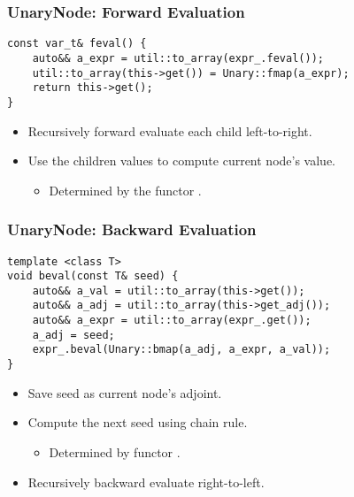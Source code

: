 \begin{frame}[fragile]
\frametitle{UnaryNode: Forward Evaluation}
\begin{lstlisting}[style=customcpp]
const var_t& feval() {
    auto&& a_expr = util::to_array(expr_.feval());
    util::to_array(this->get()) = Unary::fmap(a_expr);
    return this->get();
}
\end{lstlisting}
\begin{itemize}
\item Recursively forward evaluate each child left-to-right.
\item Use the children values to compute current node's value.
    \begin{itemize}
        \item Determined by the functor .
    \end{itemize}
\end{itemize}
\end{frame}

\begin{frame}[fragile]
\frametitle{UnaryNode: Backward Evaluation}
\begin{lstlisting}[style=customcpp]
template <class T>
void beval(const T& seed) {
    auto&& a_val = util::to_array(this->get());
    auto&& a_adj = util::to_array(this->get_adj());
    auto&& a_expr = util::to_array(expr_.get());
    a_adj = seed;
    expr_.beval(Unary::bmap(a_adj, a_expr, a_val));
}
\end{lstlisting}
\begin{itemize}
\item Save seed as current node's adjoint.
\item Compute the next seed using chain rule.
    \begin{itemize}
        \item Determined by functor .
    \end{itemize}
\item Recursively backward evaluate right-to-left.
\end{itemize}
\end{frame}

